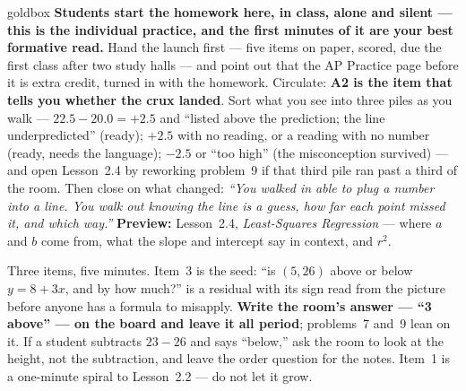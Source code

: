 \documentclass[10pt]{article}
\begin{document}
\boxguard
\begin{skillbox}{goldbox}
\textbf{Students start the homework here, in class, alone and silent --- this is the individual
practice, and the first minutes of it are your best formative read.} Hand the launch first ---
five items on paper, scored, due the first class after two study halls --- and point out that
the AP Practice page before it is extra credit, turned in with the homework. Circulate:
\textbf{A2 is the item that tells you whether the crux landed}. Sort what you see into three
piles as you walk --- $22.5 - 20.0 = +2.5$ and ``listed above the prediction; the line
underpredicted'' (ready); $+2.5$ with no reading, or a reading with no number (ready, needs the
language); $-2.5$ or ``too high'' (the misconception survived) --- and open Lesson~2.4 by
reworking problem~9 if that third pile ran past a third of the room. Then close on what changed:
\emph{``You walked in able to plug a number into a line. You walk out knowing the line is a
guess, how far each point missed it, and which way.''} \textbf{Preview:} Lesson~2.4,
\emph{Least-Squares Regression} --- where $a$ and $b$ come from, what the slope and intercept
say in context, and $r^2$.
\end{skillbox}

\begin{teachernote}[Warm-Up]
Three items, five minutes. Item~3 is the seed: ``is $(5, 26)$ above or below $y = 8 + 3x$, and by
how much?'' is a residual with its sign read from the picture before anyone has a formula to
misapply. \textbf{Write the room's answer --- ``3 above'' --- on the board and leave it all
period}; problems~7 and~9 lean on it. If a student subtracts $23 - 26$ and says ``below,'' ask
the room to look at the height, not the subtraction, and leave the order question for the notes.
Item~1 is a one-minute spiral to Lesson~2.2 --- do not let it grow.
\end{teachernote}
\end{document}
